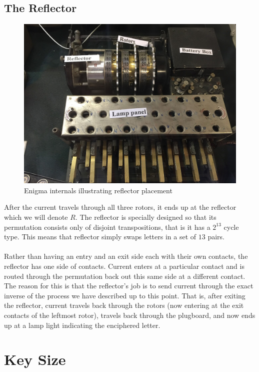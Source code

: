 \subsection{The Reflector}
\begin{figure}[H]
  \begin{center}\includegraphics[scale=0.3]{paper/images/internals.jpg}
  \end{center}
  \label{ref:internals}
  \caption{Enigma internals illustrating reflector placement~\cite{Enigma_insides_agr}}
\end{figure}
\noindent After the current travels through all three rotors, it ends up at the
reflector which we will denote $R$. The reflector is specially
designed so that its permutation consists only of disjoint
transpositions, that is it has a $2^{13}$ cycle type. This means that
reflector simply swaps letters in a set of $13$ pairs.
\\\\Rather than having an entry and an exit side each with their own
contacts, the reflector has one side of contacts. Current enters at a
particular contact and is routed through the permutation back out
this same side at a different contact. The reason for this is that
the reflector's job is to send current through the exact inverse of
the process we have described up to this point. That is, after
exiting the reflector, current travels back through the rotors (now
entering at the exit contacts of the leftmost rotor), travels back
through the plugboard, and now ends up at a lamp light indicating the
enciphered letter.

\section{Key Size}

